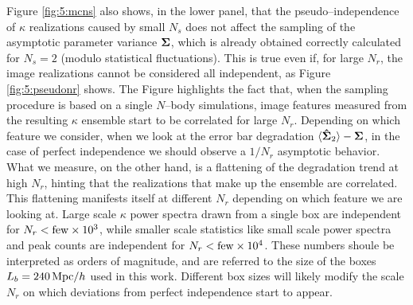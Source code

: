 Figure \ref{fig:5:mcns} also shows, in the lower panel, that the pseudo--independence of $\kappa$ realizations caused by small $N_s$ does not affect the sampling of the asymptotic parameter variance $\mathbf{\Sigma}$, which is already obtained correctly calculated for $N_s=2$ (modulo statistical fluctuations). This is true even if, for large $N_r$, the image realizations cannot be considered all independent, as Figure \ref{fig:5:pseudonr} shows. The Figure highlights the fact that, when the sampling procedure is based on a single $N$--body simulations, image features measured from the resulting $\kappa$ ensemble start to be correlated for large $N_r$. Depending on which feature we consider, when we look at the error bar  degradation $\langle\mathbf{\hat{\Sigma}}_2\rangle-\mathbf{\Sigma}$, in the case of perfect independence we should observe a $1/N_r$ asymptotic behavior. What we measure, on the other hand, is a flattening of the degradation trend at high $N_r$, hinting that the realizations that make up the ensemble are correlated. This flattening manifests itself at different $N_r$ depending on which feature we are looking at. Large scale $\kappa$ power spectra drawn from a single box are independent for $N_r<{\rm few}\times 10^3$, while smaller scale statistics like small scale power spectra and peak counts are independent for $N_r<{\rm few}\times 10^4$. These numbers shoule be interpreted as orders of magnitude, and are referred to the size of the boxes $L_b=240\,{\rm Mpc}/h$ used in this work. Different box sizes will likely modify the scale $N_r$ on which deviations from perfect independence start to appear.   


